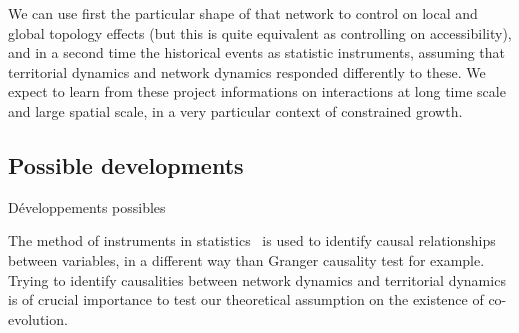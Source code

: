 We can use first the particular shape of that network to control on local and global topology effects (but this is quite equivalent as controlling on accessibility), and in a second time the historical events as statistic instruments, assuming that territorial dynamics and network dynamics responded differently to these. We expect to learn from these project informations on interactions at long time scale and large spatial scale, in a very particular context of constrained growth. 






\subsection{Possible developments}{Développements possibles}


The method of instruments in statistics~\cite{angrist1996identification} is used to identify causal relationships between variables, in a different way than Granger causality test for example. Trying to identify causalities between network dynamics and territorial dynamics is of crucial importance to test our theoretical assumption on the existence of co-evolution.









